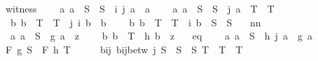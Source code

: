 \begin{isabellebody}
\ \ \ witness{\isacharcolon}{\kern0pt}\isanewline
\ \ \ \ {\isachardoublequoteopen}{\isasymAnd}a{\isachardot}{\kern0pt}\ a\ {\isasymin}\ S\ {\isacharminus}{\kern0pt}\ S{\isacharprime}{\kern0pt}\ {\isasymLongrightarrow}\ i\ {\isacharparenleft}{\kern0pt}j\ a{\isacharparenright}{\kern0pt}\ {\isacharequal}{\kern0pt}\ a{\isachardoublequoteclose}\isanewline
\ \ \ \ {\isachardoublequoteopen}{\isasymAnd}a{\isachardot}{\kern0pt}\ a\ {\isasymin}\ S\ {\isacharminus}{\kern0pt}\ S{\isacharprime}{\kern0pt}\ {\isasymLongrightarrow}\ j\ a\ {\isasymin}\ T\ {\isacharminus}{\kern0pt}\ T{\isacharprime}{\kern0pt}{\isachardoublequoteclose}\isanewline
\ \ \ \ {\isachardoublequoteopen}{\isasymAnd}b{\isachardot}{\kern0pt}\ b\ {\isasymin}\ T\ {\isacharminus}{\kern0pt}\ T{\isacharprime}{\kern0pt}\ {\isasymLongrightarrow}\ j\ {\isacharparenleft}{\kern0pt}i\ b{\isacharparenright}{\kern0pt}\ {\isacharequal}{\kern0pt}\ b{\isachardoublequoteclose}\isanewline
\ \ \ \ {\isachardoublequoteopen}{\isasymAnd}b{\isachardot}{\kern0pt}\ b\ {\isasymin}\ T\ {\isacharminus}{\kern0pt}\ T{\isacharprime}{\kern0pt}\ {\isasymLongrightarrow}\ i\ b\ {\isasymin}\ S\ {\isacharminus}{\kern0pt}\ S{\isacharprime}{\kern0pt}{\isachardoublequoteclose}\isanewline
\ \ \ nn{\isacharcolon}{\kern0pt}\isanewline
\ \ \ \ {\isachardoublequoteopen}{\isasymAnd}a{\isachardot}{\kern0pt}\ a\ {\isasymin}\ S{\isacharprime}{\kern0pt}\ {\isasymLongrightarrow}\ g\ a\ {\isacharequal}{\kern0pt}\ z{\isachardoublequoteclose}\isanewline
\ \ \ \ {\isachardoublequoteopen}{\isasymAnd}b{\isachardot}{\kern0pt}\ b\ {\isasymin}\ T{\isacharprime}{\kern0pt}\ {\isasymLongrightarrow}\ h\ b\ {\isacharequal}{\kern0pt}\ z{\isachardoublequoteclose}\isanewline
\ \ \ eq{\isacharcolon}{\kern0pt}\isanewline
\ \ \ \ {\isachardoublequoteopen}{\isasymAnd}a{\isachardot}{\kern0pt}\ a\ {\isasymin}\ S\ {\isasymLongrightarrow}\ h\ {\isacharparenleft}{\kern0pt}j\ a{\isacharparenright}{\kern0pt}\ {\isacharequal}{\kern0pt}\ g\ a{\isachardoublequoteclose}\isanewline
\ \ \ {\isachardoublequoteopen}F\ g\ S\ {\isacharequal}{\kern0pt}\ F\ h\ T{\isachardoublequoteclose}\isanewline
%
\isadelimproof
%
\endisadelimproof
%
\isatagproof
{}\isamarkupfalse%
\ {\isacharminus}{\kern0pt}\isanewline
\ \ \isamarkupfalse%
\ bij{\isacharcolon}{\kern0pt}\ {\isachardoublequoteopen}bij{\isacharunderscore}{\kern0pt}betw\ j\ {\isacharparenleft}{\kern0pt}S\ {\isacharminus}{\kern0pt}\ {\isacharparenleft}{\kern0pt}S{\isacharprime}{\kern0pt}\ {\isasyminter}\ S{\isacharparenright}{\kern0pt}{\isacharparenright}{\kern0pt}\ {\isacharparenleft}{\kern0pt}T\ {\isacharminus}{\kern0pt}\ {\isacharparenleft}{\kern0pt}T{\isacharprime}{\kern0pt}\ {\isasyminter}\ T{\isacharparenright}{\kern0pt}{\isacharparenright}{\kern0pt}{\isachardoublequoteclose}\isanewline

\end{isabellebody}
